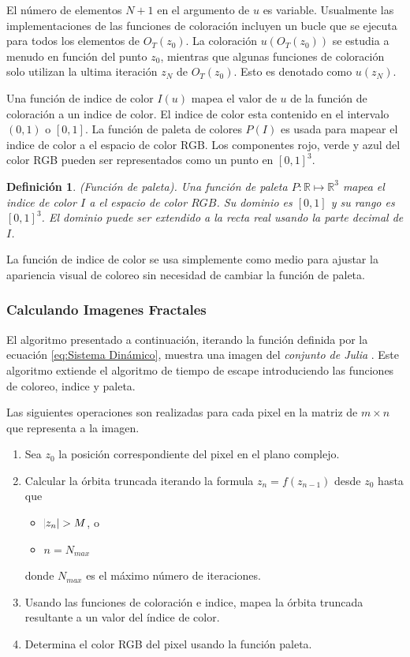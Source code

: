 \documentclass[12pt,letterpaper,final]{article}
\theoremstyle{plain}
\newtheorem{defn}{Definición}[section]
\theoremstyle{definition}
\theoremstyle{remark}
\numberwithin{equation}{section}
\begin{document}
El número de elementos $N+1$ en el argumento de $u$ es variable. Usualmente las implementaciones de las funciones de coloración incluyen un bucle que se ejecuta para todos los elementos de $O_T(z_0)$. La coloración $u(O_T(z_0))$ se estudia a menudo en función del punto $z_0$, mientras que algunas funciones de coloración solo utilizan la ultima iteración $z_N$ de $O_T(z_0)$. Esto es denotado como $u(z_N)$.

Una función de indice de color $I(u)$ mapea el valor de $u$ de la función de coloración a un indice de color. El indice de color esta contenido en el intervalo $(0,1)$ o $[0,1]$. La función de paleta de colores $P(I)$ es usada para mapear el indice de color a el espacio de color RGB. Los componentes rojo, verde y azul del color RGB pueden ser representados como un punto en $[0,1]^3$.

\begin{defn}
(Función de paleta). Una función de paleta $P:\mathds{R}\longmapsto\mathds{R}^3$ mapea el indice de color $I$ a el espacio de color $RGB$. Su dominio es $[0,1]$ y su rango es $[0,1]^3$. El dominio puede ser extendido a la recta real usando la parte decimal de $I$.
\end{defn}

La función de indice de color se usa simplemente como medio para ajustar la apariencia visual de coloreo sin necesidad de cambiar la función de paleta.

\subsubsection{Calculando Imagenes Fractales}
El algoritmo presentado a continuación, iterando la función definida por la ecuación \ref{eq:Sistema Dinámico}, muestra una imagen del \textit{conjunto de Julia} \cite{Fractals Everywhere}. Este algoritmo extiende el algoritmo de tiempo de escape\cite{Fractals Everywhere} introduciendo las funciones de coloreo, indice y paleta.

Las siguientes operaciones son realizadas para cada pixel en la matriz de $m\times n$ que representa a la imagen.

\begin{enumerate}
	\item Sea $z_0$ la posición correspondiente del pixel en el plano complejo.
	\item Calcular la órbita truncada iterando la formula $z_n = f(z_{n-1})$ desde $z_0$ hasta que \begin{itemize}
		\item $\abs{z_n} > M$, o
		\item $n = N_{max}$
	\end{itemize}
	donde $N_{max}$ es el máximo número de iteraciones.
	\item Usando las funciones de coloración e indice, mapea la órbita truncada  resultante a un valor del índice de color.
	\item Determina el color RGB del pixel usando la función paleta.
\end{enumerate}
\end{document}
